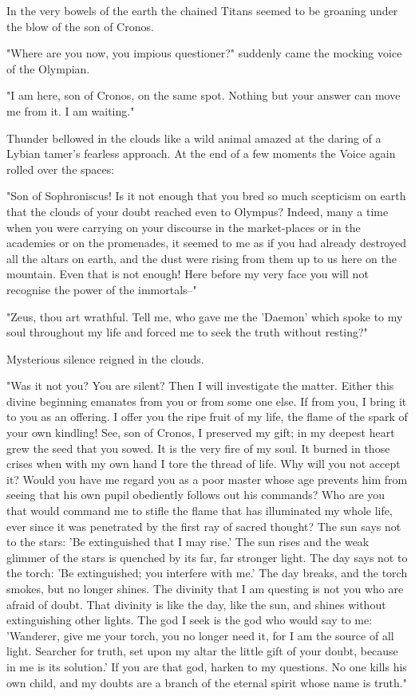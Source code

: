 In the very bowels of the earth the chained Titans seemed to be
groaning under the blow of the son of Cronos.

"Where are you now, you impious questioner?" suddenly came the mocking
voice of the Olympian.

"I am here, son of Cronos, on the same spot. Nothing but your answer
can move me from it. I am waiting."

Thunder bellowed in the clouds like a wild animal amazed at the daring
of a Lybian tamer's fearless approach. At the end of a few moments the
Voice again rolled over the spaces:

"Son of Sophroniscus! Is it not enough that you bred so much
scepticism on earth that the clouds of your doubt reached even to
Olympus? Indeed, many a time when you were carrying on your discourse
in the market-places or in the academies or on the promenades, it
seemed to me as if you had already destroyed all the altars on earth,
and the dust were rising from them up to us here on the mountain. Even
that is not enough! Here before my very face you will not recognise
the power of the immortals--"

"Zeus, thou art wrathful. Tell me, who gave me the 'Daemon' which
spoke to my soul throughout my life and forced me to seek the truth
without resting?"

Mysterious silence reigned in the clouds.

"Was it not you? You are silent? Then I will investigate the matter.
Either this divine beginning emanates from you or from some one else.
If from you, I bring it to you as an offering. I offer you the ripe
fruit of my life, the flame of the spark of your own kindling! See,
son of Cronos, I preserved my gift; in my deepest heart grew the seed
that you sowed. It is the very fire of my soul. It burned in those
crises when with my own hand I tore the thread of life. Why will you
not accept it? Would you have me regard you as a poor master whose age
prevents him from seeing that his own pupil obediently follows out his
commands? Who are you that would command me to stifle the flame that
has illuminated my whole life, ever since it was penetrated by the
first ray of sacred thought? The sun says not to the stars: 'Be
extinguished that I may rise.' The sun rises and the weak glimmer of
the stars is quenched by its far, far stronger light. The day says not
to the torch: 'Be extinguished; you interfere with me.' The day
breaks, and the torch smokes, but no longer shines. The divinity that
I am questing is not you who are afraid of doubt. That divinity is
like the day, like the sun, and shines without extinguishing other
lights. The god I seek is the god who would say to me: 'Wanderer, give
me your torch, you no longer need it, for I am the source of all
light. Searcher for truth, set upon my altar the little gift of your
doubt, because in me is its solution.' If you are that god, harken to
my questions. No one kills his own child, and my doubts are a branch
of the eternal spirit whose name is truth."

